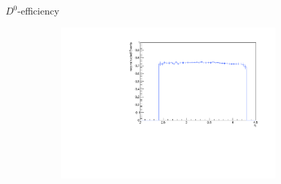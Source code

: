 \documentclass[11pt]{beamer}
\begin{document}
\begin{frame}{$D^0$-efficiency}
\begin{figure}
\begin{subfigure}{0.45\textwidth}
\end{subfigure}
\begin{subfigure}{0.45\textwidth}
\includegraphics[width=0.9\textwidth]{up_pdf/single/neg/h_eta_reco_D0_neg.pdf}
\end{subfigure}
\end{figure}
\end{frame}
\end{document}
